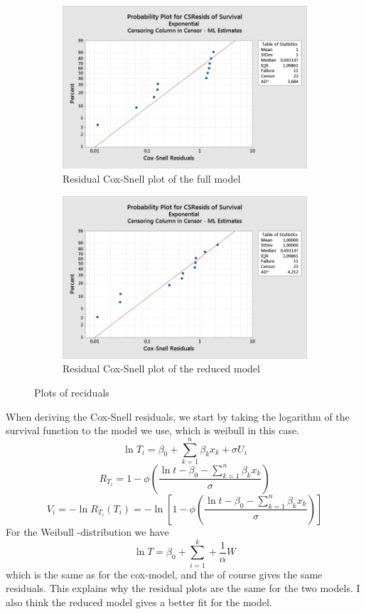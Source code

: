 \documentclass[10pt, a4paper]{article}
\begin{document}
\begin{figure}
\begin{subfigure}[b]{0.4\textwidth}
                 \includegraphics[width=\textwidth]{coxful}
                 \caption{Residual Cox-Snell plot of the full model}
                 \label{coxful}
         \end{subfigure}
         \begin{subfigure}[b]{0.4\textwidth}
                 \includegraphics[width=\textwidth]{coxred}
                 \caption{Residual Cox-Snell plot of the reduced model}
                 \label{coxred}
         \end{subfigure}
         \caption{Plots of reciduals}\label{4x}
\end{figure}
When deriving the Cox-Snell residuals, we start by taking the logarithm of the survival function to the model we use, which is weibull in this case.
$$ \ln T_i = \beta _0 +  \sum \limits_{k = 1}^{n} \beta_k x_k+\sigma U_i   $$
$$ R_{T_i} =  1- \phi ( \frac{\ln t-\beta _0 -  \sum \limits_{k = 1}^{n} \beta_k x_k}{\sigma}) $$
$$ V_i = -\ln R_{T_i}(T_i) = -\ln[ 1- \phi ( \frac{\ln t-\beta _0 -  \sum \limits_{k = 1}^{n} \beta_k x_k}{\sigma}) ] $$
For the Weibull -distribution we have $$ \ln T = \beta_0 + \sum \limits_{i=1}^k+\frac{1}{\alpha} W $$ which is the same as for the cox-model, and the of course gives the same residuals. This explains why the residual plots are the same for the two models. I also think the reduced model gives a better fit for the model.
\end{document}
